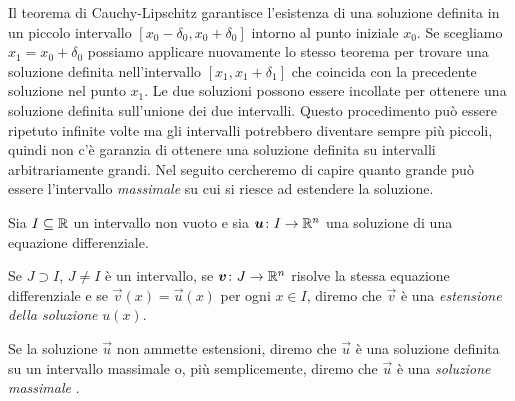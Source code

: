 Il teorema di Cauchy-Lipschitz garantisce l'esistenza di una soluzione
definita in un
piccolo intervallo $[x_0-\delta_0, x_0+\delta_0]$ intorno al punto iniziale $x_0$.
Se scegliamo $x_1 = x_0+\delta_0$ possiamo applicare nuovamente lo stesso
teorema per trovare una soluzione definita nell'intervallo
$[x_1, x_1+\delta_1]$
che coincida con la precedente soluzione nel punto $x_1$.
Le due soluzioni possono
essere incollate per ottenere una soluzione definita sull'unione dei due intervalli.
Questo procedimento può essere ripetuto infinite volte ma gli intervalli
potrebbero diventare sempre più piccoli, quindi non c'è garanzia di ottenere una
soluzione definita su intervalli arbitrariamente grandi.
Nel seguito cercheremo di capire quanto grande può essere l'intervallo
\emph{massimale} su cui si riesce ad estendere la soluzione.

\begin{definition}
Sia $I\subseteq {\mathbb R}$ un intervallo non vuoto e sia $\boldsymbol u \colon I \to {\mathbb R}^n$
una soluzione di una equazione differenziale.

Se $J\supset I$, $J \neq I$ è un intervallo, se $\boldsymbol v\colon J \to {\mathbb R}^n$
risolve la stessa equazione differenziale
e se $\vec v(x)=\vec u(x)$ per ogni $x\in I$,
diremo che $\vec v$ è una \emph{estensione della soluzione}%
 $u(x)$.

Se la soluzione $\vec u$ non ammette estensioni, diremo che $\vec u$ è una
soluzione definita su un intervallo massimale o, più semplicemente, diremo
che $\vec u$ è una \emph{soluzione massimale}%
.
\end{definition}


